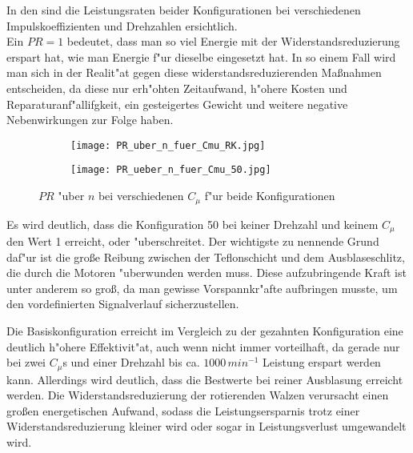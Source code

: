 In den  sind die Leistungsraten beider Konfigurationen bei verschiedenen Impulskoeffizienten und Drehzahlen ersichtlich.\\
Ein $PR= 1$ bedeutet, dass man so viel Energie mit der Widerstandsreduzierung erspart hat, wie man Energie f"ur dieselbe eingesetzt hat. In so einem Fall wird man sich in der Realit"at gegen diese widerstandsreduzierenden Ma\ss{}nahmen entscheiden, da diese nur erh"ohten Zeitaufwand, h"ohere Kosten und Reparaturanf"allifgkeit, ein gesteigertes Gewicht und weitere negative Nebenwirkungen zur Folge haben.


\begin{figure}[h]
	\centering
	\begin{subfigure}[c]{0.45\textwidth}		
		\texttt{[image: PR\_uber\_n\_fuer\_Cmu\_RK.jpg]}
		\label{fig:PR RK}
	\end{subfigure}
	\begin{subfigure}[c]{0.45\textwidth}
		\texttt{[image: PR\_ueber\_n\_fuer\_Cmu\_50.jpg]}
		\label{fig:PR 50}
	\end{subfigure}
		\caption{$PR$ "uber $n$ bei verschiedenen $C_{\mu}$ f"ur beide Konfigurationen}
	\label{fig:PR}
\end{figure}

Es wird deutlich, dass die Konfiguration 50 bei keiner Drehzahl und keinem $C_{\mu}$ den Wert 1 erreicht, oder "uberschreitet. Der wichtigste zu nennende Grund daf"ur ist die gro\ss{}e Reibung zwischen der Teflonschicht und dem Ausblaseschlitz, die durch die Motoren "uberwunden werden muss. Diese aufzubringende Kraft ist unter anderem so gro\ss{}, da man gewisse Vorspannkr"afte aufbringen musste, um den vordefinierten Signalverlauf sicherzustellen.

Die Basiskonfiguration erreicht im Vergleich zu der gezahnten Konfiguration eine deutlich h"ohere Effektivit"at, auch wenn nicht immer vorteilhaft, da gerade nur bei zwei $C_{\mu}$s und einer Drehzahl bis ca. $1000$\,$min^{-1}$ Leistung erspart werden kann. Allerdings wird deutlich, dass die Bestwerte bei reiner Ausblasung erreicht werden. Die Widerstandsreduzierung der rotierenden Walzen verursacht einen gro\ss{}en energetischen Aufwand, sodass die Leistungsersparnis trotz einer Widerstandsreduzierung kleiner wird oder sogar in Leistungsverlust umgewandelt wird.